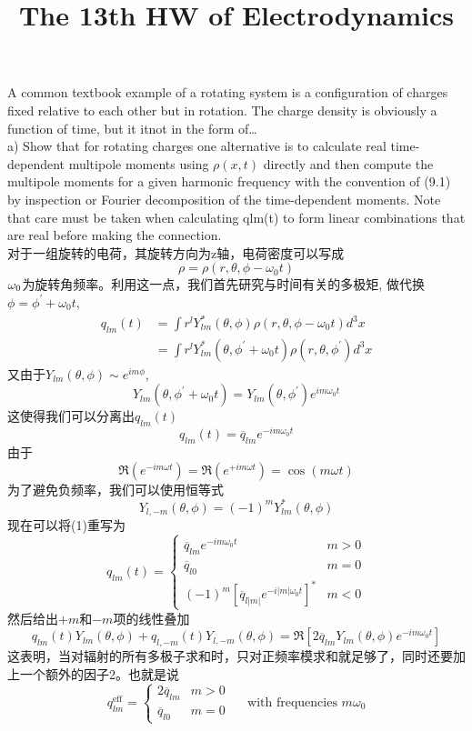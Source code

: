 \documentclass[UTF8,9pt]{ctexart}
\title{The 13th HW of Electrodynamics}
\begin{document}
 
\maketitle
{}
A common textbook example of a rotating system is a configuration of charges fixed relative to each other but in rotation. The charge density is obviously a function of time, but it itnot in the form of\dots\\
a) Show that for rotating charges one alternative is to calculate real time-dependent
multipole moments using $ρ(x, t)$ directly and then compute the multipole moments for a given harmonic frequency with the convention of (9.1) by inspection
or Fourier decomposition of the time-dependent moments. Note that care must
be taken when calculating qlm(t) to form linear combinations that are real before
making the connection.\\
对于一组旋转的电荷，其旋转方向为z轴，电荷密度可以写成$$ 
\rho=\rho\left(r, \theta, \phi-\omega_{0} t\right)
 $$$\omega_0$为旋转角频率。利用这一点，我们首先研究与时间有关的多极矩, 做代换$\phi=\phi^{\prime}+\omega_{0} t$, $$ 
\begin{aligned} q_{l m}(t) &=\int r^{l} Y_{l m}^{*}(\theta, \phi) \rho\left(r, \theta, \phi-\omega_{0} t\right) d^{3} x \\ &=\int r^{l} Y_{l m}^{*}\left(\theta, \phi^{\prime}+\omega_{0} t\right) \rho\left(r, \theta, \phi^{\prime}\right) d^{3} x \end{aligned}
 $$
 又由于$Y_{l m}(\theta, \phi) \sim e^{i m \phi}$,
 $$ 
Y_{l m}\left(\theta, \phi^{\prime}+\omega_{0} t\right)=Y_{l m}\left(\theta, \phi^{\prime}\right) e^{i m \omega_{0} t}
 $$这使得我们可以分离出$q_{l m}(t)$\begin{equation}
 q_{l m}(t)=\overline{q}_{l m} e^{-i m \omega_{0} t}
\end{equation}
由于$$ 
  \Re\left(e^{-i m \omega t}\right)=\Re\left(e^{+i m \omega t}\right)=\cos (m \omega t)
   $$为了避免负频率，我们可以使用恒等式$$ 
   Y_{l,-m}(\theta, \phi)=(-1)^{m} Y_{l m}^{*}(\theta, \phi)
    $$
现在可以将(1)重写为$$ 
q_{l m}(t)=\left\{\begin{array}{ll}{\overline{q}_{l m} e^{-i m \omega_{0} t}} & {m>0} \\ {\overline{q}_{l 0}} & {m=0} \\ {(-1)^{m}\left[\overline{q}_{l|m|} e^{-i|m| \omega_{0} t}\right]^{*}} & {m<0}\end{array}\right.
 $$然后给出$+m$和$-m$项的线性叠加$$ 
 q_{l m}(t) Y_{l m}(\theta, \phi)+q_{l,-m}(t) Y_{l,-m}(\theta, \phi)=\Re\left[2 \overline{q}_{l m} Y_{l m}(\theta, \phi) e^{-i m \omega_{0} t}\right]
  $$这表明，当对辐射的所有多极子求和时，只对正频率模求和就足够了，同时还要加上一个额外的因子2。也就是说\begin{equation}
q_{l m}^{\mathrm{eff}}=\left\{\begin{array}{ll}{2 \overline{q}_{l m}} & {m>0} \\ {\overline{q}_{l 0}} & {m=0}\end{array}\right. \quad \text { with frequencies } m \omega_{0}
\end{equation}
\end{document}
